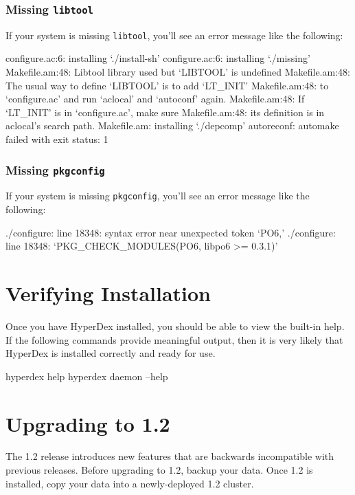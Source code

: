 \subsubsection{Missing \texttt{libtool}}
\label{sec:installation:troubleshooting:libtool}

If your system is missing \texttt{libtool}, you'll see an error message like the
following:

\begin{consolecode}
configure.ac:6: installing `./install-sh'
configure.ac:6: installing `./missing'
Makefile.am:48: Libtool library used but `LIBTOOL' is undefined
Makefile.am:48:   The usual way to define `LIBTOOL' is to add `LT_INIT'
Makefile.am:48:   to `configure.ac' and run `aclocal' and `autoconf' again.
Makefile.am:48:   If `LT_INIT' is in `configure.ac', make sure
Makefile.am:48:   its definition is in aclocal's search path.
Makefile.am: installing `./depcomp'
autoreconf: automake failed with exit status: 1
\end{consolecode}

\subsubsection{Missing \texttt{pkgconfig}}
\label{sec:installation:troubleshooting:pkgconfig}

If your system is missing \texttt{pkgconfig}, you'll see an error message like
the following:

\begin{consolecode}
./configure: line 18348: syntax error near unexpected token `PO6,'
./configure: line 18348: `PKG_CHECK_MODULES(PO6, libpo6 >= 0.3.1)'
\end{consolecode}

\section{Verifying Installation}
\label{sec:installation:verify}

Once you have HyperDex installed, you should be able to view the built-in help.
If the following commands provide meaningful output, then it is very likely that
HyperDex is installed correctly and ready for use.

\begin{consolecode}
hyperdex help
hyperdex daemon --help
\end{consolecode}

\section{Upgrading to 1.2}

The 1.2 release introduces new features that are backwards incompatible with
previous releases.  Before upgrading to 1.2, backup your data.  Once 1.2 is
installed, copy your data into a newly-deployed 1.2 cluster.
